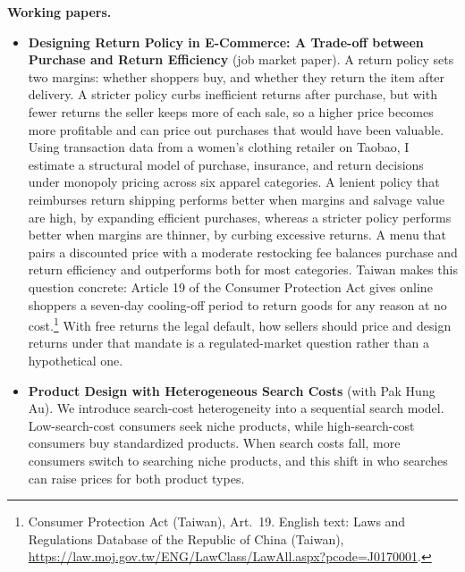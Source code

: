 \documentclass[11pt,letterpaper]{article}
\begin{document}
\medskip
\noindent\textbf{Working papers.}
\begin{itemize}[leftmargin=1.6em,itemsep=0.2em,topsep=0.1em,parsep=0.1em]
\item \textbf{Designing Return Policy in E-Commerce: A Trade-off between Purchase and Return Efficiency} (job market paper). A return policy sets two margins: whether shoppers buy, and whether they return the item after delivery. A stricter policy curbs inefficient returns after purchase, but with fewer returns the seller keeps more of each sale, so a higher price becomes more profitable and can price out purchases that would have been valuable. Using transaction data from a women's clothing retailer on Taobao, I estimate a structural model of purchase, insurance, and return decisions under monopoly pricing across six apparel categories. A lenient policy that reimburses return shipping performs better when margins and salvage value are high, by expanding efficient purchases, whereas a stricter policy performs better when margins are thinner, by curbing excessive returns. A menu that pairs a discounted price with a moderate restocking fee balances purchase and return efficiency and outperforms both for most categories. Taiwan makes this question concrete: Article 19 of the Consumer Protection Act gives online shoppers a seven-day cooling-off period to return goods for any reason at no cost.\footnote{Consumer Protection Act (Taiwan), Art.~19. English text: Laws and Regulations Database of the Republic of China (Taiwan), \url{https://law.moj.gov.tw/ENG/LawClass/LawAll.aspx?pcode=J0170001}.} With free returns the legal default, how sellers should price and design returns under that mandate is a regulated-market question rather than a hypothetical one.
\item \textbf{Product Design with Heterogeneous Search Costs} (with Pak Hung Au). We introduce search-cost heterogeneity into a sequential search model. Low-search-cost consumers seek niche products, while high-search-cost consumers buy standardized products. When search costs fall, more consumers switch to searching niche products, and this shift in who searches can raise prices for both product types.
\end{itemize}
\end{document}
